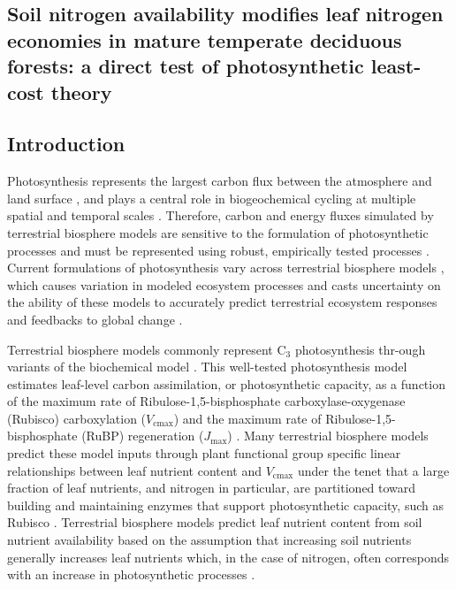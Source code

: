 \begin{singlespace}
    \chapter{\textbf{Soil nitrogen availability modifies leaf nitrogen economies in mature temperate deciduous forests: a direct test of photosynthetic least-cost theory}}
\end{singlespace}

\section{Introduction}
\noindent Photosynthesis represents the largest carbon flux between the atmosphere and land surface , and plays a central role in biogeochemical cycling at multiple spatial and temporal scales . Therefore, carbon and energy fluxes simulated by terrestrial biosphere models are sensitive to the formulation of photosynthetic processes  and must be represented using robust, empirically tested processes . Current formulations of photosynthesis vary across terrestrial biosphere models , which causes variation in modeled ecosystem processes  and casts uncertainty on the ability of these models to accurately predict terrestrial ecosystem responses and feedbacks to global change .

Terrestrial biosphere models commonly represent C$_{3}$ photosynthesis thr-ough variants of the  biochemical model . This well-tested photosynthesis model estimates leaf-level carbon assimilation, or photosynthetic capacity, as a function of the maximum rate of Ribulose-1,5-bisphosphate carboxylase-oxygenase (Rubisco) carboxylation ($V_\mathrm{cmax}$) and the maximum rate of Ribulose-1,5-bisphosphate (RuBP) regeneration ($J_\mathrm{max}$) . Many terrestrial biosphere models predict these model inputs through plant functional group specific linear relationships between leaf nutrient content and $V_\mathrm{cmax}$  under the tenet that a large fraction of leaf nutrients, and nitrogen in particular, are partitioned toward building and maintaining enzymes that support photosynthetic capacity, such as Rubisco . Terrestrial biosphere models predict leaf nutrient content from soil nutrient availability based on the assumption that increasing soil nutrients generally increases leaf nutrients  which, in the case of nitrogen, often corresponds with an increase in photosynthetic processes .

